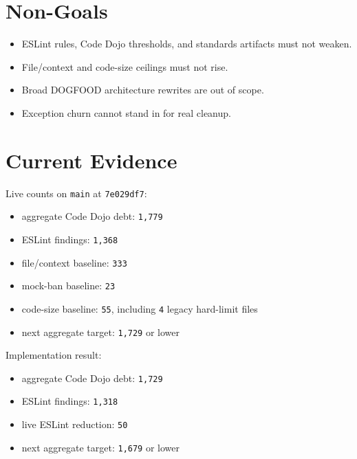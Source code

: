 \section{Non-Goals}\label{record-222-non-goals}

\begin{itemize}
\tightlist
\item
  ESLint rules, Code Dojo thresholds, and standards artifacts must not weaken.
\item
  File/context and code-size ceilings must not rise.
\item
  Broad DOGFOOD architecture rewrites are out of scope.
\item
  Exception churn cannot stand in for real cleanup.
\end{itemize}

\section{Current Evidence}\label{record-222-current-evidence}

Live counts on \texttt{m\allowbreak{}a\allowbreak{}i\allowbreak{}n} at \texttt{7\allowbreak{}e\allowbreak{}0\allowbreak{}2\allowbreak{}9\allowbreak{}d\allowbreak{}f\allowbreak{}7}:

\begin{itemize}
\tightlist
\item
  aggregate Code Dojo debt: \texttt{1\allowbreak{},\allowbreak{}7\allowbreak{}7\allowbreak{}9}
\item
  ESLint findings: \texttt{1\allowbreak{},\allowbreak{}3\allowbreak{}6\allowbreak{}8}
\item
  file/context baseline: \texttt{3\allowbreak{}3\allowbreak{}3}
\item
  mock-ban baseline: \texttt{2\allowbreak{}3}
\item
  code-size baseline: \texttt{5\allowbreak{}5}, including \texttt{4} legacy hard-limit files
\item
  next aggregate target: \texttt{1\allowbreak{},\allowbreak{}7\allowbreak{}2\allowbreak{}9} or lower
\end{itemize}

Implementation result:

\begin{itemize}
\tightlist
\item
  aggregate Code Dojo debt: \texttt{1\allowbreak{},\allowbreak{}7\allowbreak{}2\allowbreak{}9}
\item
  ESLint findings: \texttt{1\allowbreak{},\allowbreak{}3\allowbreak{}1\allowbreak{}8}
\item
  live ESLint reduction: \texttt{5\allowbreak{}0}
\item
  next aggregate target: \texttt{1\allowbreak{},\allowbreak{}6\allowbreak{}7\allowbreak{}9} or lower
\end{itemize}

